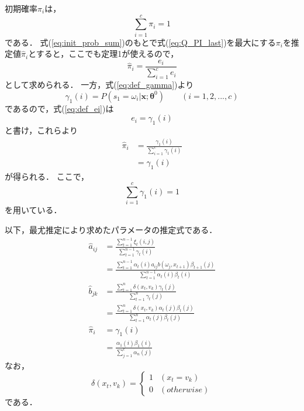 \documentclass[a4j]{jarticle}
\begin{document}
初期確率$\pi_{i}$は，
\begin{equation}
\sum_{i=1}^{c} \pi_{i} = 1 \label{eq:init_prob_sum}
\end{equation}
である．
式(\ref{eq:init_prob_sum})のもとで式(\ref{eq:Q_PI_last})を最大にする$\pi_{i}$を推定値$\hat{\pi}_{i}$とすると，ここでも定理1が使えるので，
\begin{equation}
\hat{\pi}_{i} = \frac{e_{i}}{\displaystyle \sum_{i=1}^{c} e_{i}}
\end{equation}
として求められる．
一方，式(\ref{eq:def_gamma})より
\begin{equation}
\gamma_{1}(i) = P(s_{1} = \omega_{i} | \mathbf{x}; \bm{\theta}^{0}) \qquad (i = 1,2,...,c)
\end{equation}
であるので，式(\ref{eq:def_ei})は
\begin{equation}
e_{i} = \gamma_{1}(i)
\end{equation}
と書け，これらより
\begin{align}
\hat{\pi}_{i} & = \frac{\gamma_{1}(i)}{\displaystyle \sum_{i=1}^{c} \gamma_{1}(i)} \\
& = \gamma_{1}(i)
\end{align}
が得られる．
ここで，
\begin{equation}
\sum_{i=1}^{c} \gamma_{1}(i) = 1
\end{equation}
を用いている．


以下，最尤推定により求めたパラメータの推定式である．
\begin{align}
\hat{a}_{ij} &  = \frac{\displaystyle \sum_{t=1}^{n-1} \xi_{t} (i, j)}{\displaystyle \sum_{t=1}^{n-1} \gamma_{t} (i)} \nonumber \\
	& = \frac{\displaystyle \sum_{t=1}^{n-1} \alpha_{t}(i) a_{ij} b(\omega_{j}, x_{t+1}) \beta_{t+1}(j)}{\displaystyle  \sum_{t=1}^{n-1}\alpha_{t}(i)\beta_{t}(i)} \label{eq:hat_a}　\\
\hat{b}_{jk} & = \frac{\displaystyle \sum_{t=1}^{n} \delta (x_{t}, v_{k}) \gamma_{t}(j)}{\displaystyle \sum_{t=1}^{n} \gamma_{t}(j)} \nonumber \\
 	& = \frac{\displaystyle \sum_{t=1}^{n} \delta(x_{t}, v_{k}) \alpha_{t}(j) \beta_{t}(j)}{\displaystyle \sum_{t=1}^{n} \alpha_{t}(j) \beta_{t}(j)} \label{eq:hat_b} \\
\hat{\pi}_{i} & = \gamma_{1}(i) \nonumber \\
	& = \frac{\alpha_{1}(i) \beta_{1}(i)}{\displaystyle  \sum_{j=1}^{c}\alpha_{n}(j)}  \label{eq:hat_pi}
\end{align}
なお，
\[
\delta(x_{t}, v_{k}) = \left\{ \begin{array}{ll}
1 & (x_{t} = v_{k}) \\
0 & \mathit{(otherwise)}
\end{array} \right.
\]
である．
\end{document}

